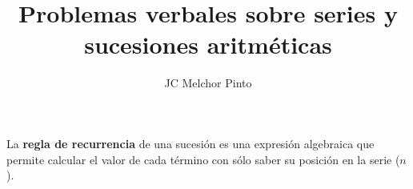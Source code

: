 \documentclass[12pt,addpoints,answers]{guia}
\title{Problemas verbales sobre series y sucesiones aritméticas}
\author{JC Melchor Pinto}
\begin{document}
\pagestyle{headandfoot}

\INFO
\printanswers
\vspace{-2em}
\begin{multicols}{2}
    
    
    
    \columnbreak
    
    
\end{multicols}
\begin{importantbox}
    La \textbf{regla de recurrencia} de una sucesión es una expresión algebraica que permite calcular el valor de cada término con sólo saber su posición en la serie ($n$).
\end{importantbox}
\begin{questions}
    \questionboxed[10]{}
    \questionboxed[10]{}
    \questionboxed[10]{}
    \questionboxed[10]{}
    \questionboxed[10]{}
    \questionboxed[10]{}
    \questionboxed[10]{}
    \questionboxed[10]{}
    \questionboxed[10]{}
    \questionboxed[10]{}
\end{questions}
\end{document}
